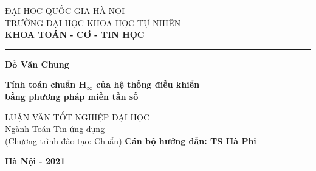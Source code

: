 \documentclass[12pt,a4paper]{article}
\begin{document}
\begin{titlepage}


\begin{center}
	{\fontsize{14pt}{15.6}\selectfont
		ĐẠI HỌC QUỐC GIA HÀ NỘI \\
		TRƯỜNG ĐẠI HỌC KHOA HỌC TỰ NHIÊN\\}
	\medspace
	{\fontsize{13pt}{15.6}\selectfont
		\textbf{KHOA TOÁN - CƠ - TIN HỌC}}
	
	\rule{7.25cm}{1pt}
	
	\vfill
	{\fontsize{14}{15.6}\selectfont \textbf{Đỗ Văn Chung}}
	\vfill
	
	{\fontsize{18}{20}\selectfont \textbf{Tính toán chuẩn H$_\infty$ của hệ thống điều khiển \\ bằng phương pháp miền tần số}}
	\vfill
	
	{\fontsize{14}{15.6}\selectfont 
		LUẬN VĂN TỐT NGHIỆP ĐẠI HỌC\\
		\vspace{1cm}
		Ngành Toán Tin ứng dụng\\
		(Chương trình đào tạo: Chuẩn)
	}
	\vfill
	{\fontsize{14}{15.6}\selectfont \textbf{Cán bộ hướng dẫn: TS Hà Phi}}
	
	\vfill
	{\fontsize{14}{15.6}\selectfont \textbf{Hà Nội - 2021}}
\end{center}
\end{titlepage}
\end{document}
